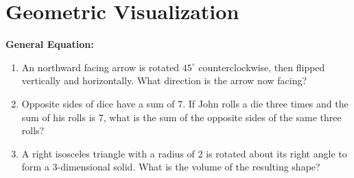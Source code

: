 \section{Geometric Visualization}

\textbf{General Equation:}

\vfill
\begin{enumerate}[labelindent=*,style=multiline,leftmargin=*,label=\textbf{Example \arabic*:}]
\item An northward facing arrow is rotated $45^\circ$ counterclockwise, then flipped vertically and horizontally. What direction is the arrow now facing?
\vfill\item Opposite sides of dice have a sum of 7. If John rolls a die three times and the sum of his rolls is 7, what is the sum of the opposite sides of the same three rolls?
\vfill\item A right isosceles triangle with a radius of 2 is rotated about its right angle to form a 3-dimensional solid. What is the volume of the resulting shape?
\end{enumerate}

